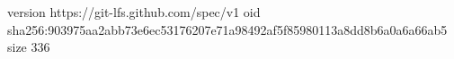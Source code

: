 version https://git-lfs.github.com/spec/v1
oid sha256:903975aa2abb73e6ec53176207e71a98492af5f85980113a8dd8b6a0a6a66ab5
size 336
